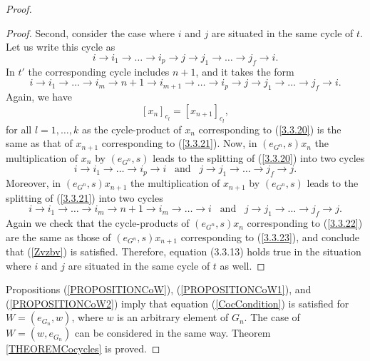 \documentclass[10pt,a4paper]{amsart}
\begin{document}
\begin{proof}
\begin{proof}
Second, consider the case where $i$ and $j$ are situated in the same cycle of $t$. Let us write this cycle as
\begin{equation}\label{3.3.20}
i\rightarrow i_1\rightarrow\ldots\rightarrow i_p\rightarrow j\rightarrow j_{1}\rightarrow
\ldots\rightarrow j_f\rightarrow i.
\end{equation}
In $t'$ the corresponding cycle includes $n+1$, and it takes the form
\begin{equation}\label{3.3.21}
i\rightarrow i_1\rightarrow\ldots\rightarrow i_{m}\rightarrow n+1\rightarrow i_{m+1}\rightarrow\ldots
\rightarrow i_p\rightarrow j\rightarrow j_{1}\rightarrow
\ldots\rightarrow j_f\rightarrow i.
\end{equation}
Again, we have
\begin{equation}
\left[x_{n}\right]_{c_l}=\left[x_{n+1}\right]_{c_l},
\end{equation}
for all $l=1,\ldots,k$ as the cycle-product of $x_n$ corresponding to (\ref{3.3.20}) is the same as that of $x_{n+1}$ corresponding to (\ref{3.3.21}). Now, in $\left(e_{G^n},s\right)x_{n}$ the multiplication of $x_n$ by $\left(e_{G^n},s\right)$ leads to the splitting of (\ref{3.3.20}) into two cycles
\begin{equation}\label{3.3.22}
i\rightarrow i_1\rightarrow\ldots\rightarrow i_p\rightarrow i\;\;\; \mbox{and}\;\;\; j\rightarrow j_{1}\rightarrow
\ldots\rightarrow j_f\rightarrow j.
\end{equation}
Moreover, in $\left(e_{G^n},s\right)x_{n+1}$ the multiplication of $x_{n+1}$ by $\left(e_{G^n},s\right)$ leads to the splitting of (\ref{3.3.21}) into two cycles
\begin{equation}\label{3.3.23}
i\rightarrow i_1\rightarrow\ldots\rightarrow i_m\rightarrow n+1\rightarrow i_m\rightarrow\ldots\rightarrow i\;\;\; \mbox{and}\;\;\; j\rightarrow j_{1}\rightarrow
\ldots\rightarrow j_f\rightarrow j.
\end{equation}
Again we check that the cycle-products of   $\left(e_{G^n},s\right)x_n$ corresponding to (\ref{3.3.22}) are the same as those of $\left(e_{G^n},s\right)x_{n+1}$ corresponding to (\ref{3.3.23}), and conclude that
(\ref{Zvzbv}) is satisfied. Therefore, equation (3.3.13) holds true in the situation where $i$ and $j$ are situated in the same cycle of $t$ as well.
\end{proof}
Propositions (\ref{PROPOSITIONCoW}), (\ref{PROPOSITIONCoW1}), and (\ref{PROPOSITIONCoW2}) imply that equation (\ref{CocCondition}) is satisfied for $W=\left(e_{G_n},w\right)$, where $w$ is an arbitrary element of $G_n$. The case of  $W=\left(w,e_{G_n}\right)$ can be considered in the same way.
Theorem \ref{THEOREMCocycles} is proved.
\end{proof}
\end{document}
